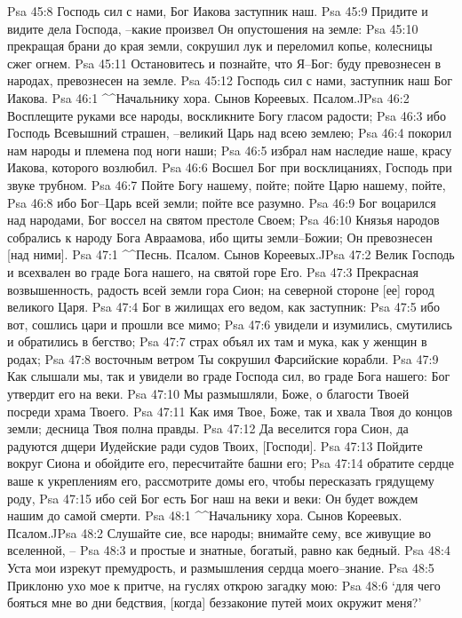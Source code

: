 Psa 45:8  Господь сил с нами, Бог Иакова заступник наш.
Psa 45:9  Придите и видите дела Господа, --какие произвел Он опустошения на земле:
Psa 45:10  прекращая брани до края земли, сокрушил лук и переломил копье, колесницы сжег огнем.
Psa 45:11  Остановитесь и познайте, что Я--Бог: буду превознесен в народах, превознесен на земле.
Psa 45:12  Господь сил с нами, заступник наш Бог Иакова.
Psa 46:1  ^^Начальнику хора. Сынов Кореевых. Псалом.^^
Psa 46:2  Восплещите руками все народы, воскликните Богу гласом радости;
Psa 46:3  ибо Господь Всевышний страшен, --великий Царь над всею землею;
Psa 46:4  покорил нам народы и племена под ноги наши;
Psa 46:5  избрал нам наследие наше, красу Иакова, которого возлюбил.
Psa 46:6  Восшел Бог при восклицаниях, Господь при звуке трубном.
Psa 46:7  Пойте Богу нашему, пойте; пойте Царю нашему, пойте,
Psa 46:8  ибо Бог--Царь всей земли; пойте все разумно.
Psa 46:9  Бог воцарился над народами, Бог воссел на святом престоле Своем;
Psa 46:10  Князья народов собрались к народу Бога Авраамова, ибо щиты земли--Божии; Он превознесен [над ними].
Psa 47:1  ^^Песнь. Псалом. Сынов Кореевых.^^
Psa 47:2  Велик Господь и всехвален во граде Бога нашего, на святой горе Его.
Psa 47:3  Прекрасная возвышенность, радость всей земли гора Сион; на северной стороне [ее] город великого Царя.
Psa 47:4  Бог в жилищах его ведом, как заступник:
Psa 47:5  ибо вот, сошлись цари и прошли все мимо;
Psa 47:6  увидели и изумились, смутились и обратились в бегство;
Psa 47:7  страх объял их там и мука, как у женщин в родах;
Psa 47:8  восточным ветром Ты сокрушил Фарсийские корабли.
Psa 47:9  Как слышали мы, так и увидели во граде Господа сил, во граде Бога нашего: Бог утвердит его на веки.
Psa 47:10  Мы размышляли, Боже, о благости Твоей посреди храма Твоего.
Psa 47:11  Как имя Твое, Боже, так и хвала Твоя до концов земли; десница Твоя полна правды.
Psa 47:12  Да веселится гора Сион, да радуются дщери Иудейские ради судов Твоих, [Господи].
Psa 47:13  Пойдите вокруг Сиона и обойдите его, пересчитайте башни его;
Psa 47:14  обратите сердце ваше к укреплениям его, рассмотрите домы его, чтобы пересказать грядущему роду,
Psa 47:15  ибо сей Бог есть Бог наш на веки и веки: Он будет вождем нашим до самой смерти.
Psa 48:1  ^^Начальнику хора. Сынов Кореевых. Псалом.^^
Psa 48:2  Слушайте сие, все народы; внимайте сему, все живущие во вселенной, --
Psa 48:3  и простые и знатные, богатый, равно как бедный.
Psa 48:4  Уста мои изрекут премудрость, и размышления сердца моего--знание.
Psa 48:5  Приклоню ухо мое к притче, на гуслях открою загадку мою:
Psa 48:6  `для чего бояться мне во дни бедствия, [когда] беззаконие путей моих окружит меня?'
